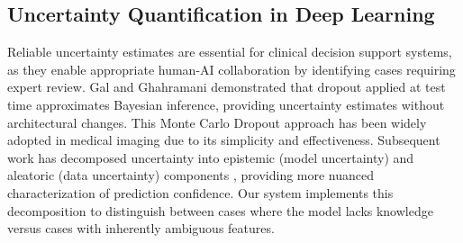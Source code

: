 \subsection{Uncertainty Quantification in Deep Learning}

Reliable uncertainty estimates are essential for clinical decision support
systems, as they enable appropriate human-AI collaboration by identifying
cases requiring expert review. Gal and Ghahramani \cite{gal2016dropout}
demonstrated that dropout applied at test time approximates Bayesian
inference, providing uncertainty estimates without architectural changes.
This Monte Carlo Dropout approach has been widely adopted in medical imaging
due to its simplicity and effectiveness. Subsequent work has decomposed
uncertainty into epistemic (model uncertainty) and aleatoric (data
uncertainty) components \cite{kendall2017uncertainties}, providing more
nuanced characterization of prediction confidence. Our system implements
this decomposition to distinguish between cases where the model lacks
knowledge versus cases with inherently ambiguous features.
